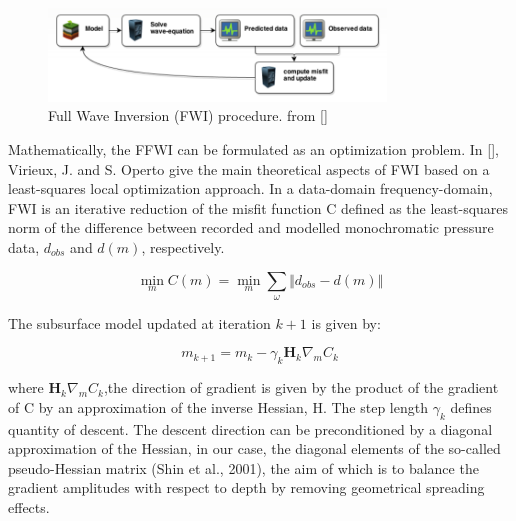 \begin{figure}[!h]
\centering 
\includegraphics[width=0.8\textwidth]{images/FFWI.png}
\caption{Full Wave Inversion (FWI) procedure. from []}
\label{FWI} 
\end{figure}

Mathematically, the FFWI can be formulated as an optimization problem. In [], Virieux, J. and S. Operto give the main theoretical aspects of FWI based on a least-squares local optimization approach. In a data-domain frequency-domain, FWI is an iterative reduction of the misfit function C defined as the least-squares norm of the difference between recorded and modelled monochromatic pressure data, $ d_{obs} $ and $ d(m)$, respectively.

$$ \min_{m} C(m) = \min_{m} \sum_{\omega} \Vert d_{obs} - d(m) \Vert $$

The subsurface model updated at iteration $ k + 1 $ is given by:

$$ m_{k+1} = m_{k} - \gamma_{k} \mathbf{H}_{k} \nabla_{m} C_{k} $$

where $ \mathbf{H}_{k} \nabla_{m} C_{k} $,the direction of gradient is given by the product of the gradient of C by an approximation of the inverse Hessian, H. The step length $ \gamma_{k} $ defines  quantity of descent. The descent direction can be preconditioned by a diagonal approximation of the Hessian, in our case, the diagonal elements of the so-called pseudo-Hessian matrix (Shin et al., 2001), the aim of which is to balance the gradient amplitudes with respect to depth by removing geometrical spreading effects. 

